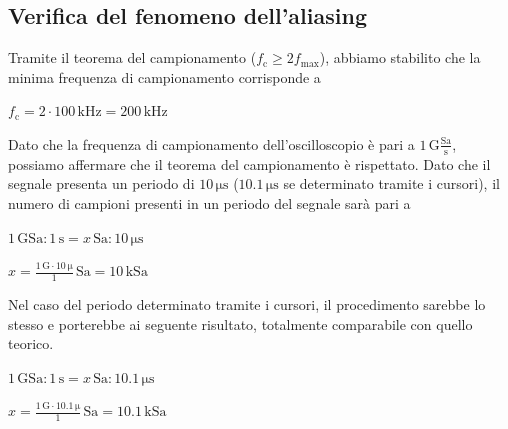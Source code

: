 \documentclass{article}
\begin{document}
		\subsection{Verifica del fenomeno dell’aliasing}
			Tramite il teorema del campionamento ($ f_{\mathrm{c}} \geq 2 f_{\mathrm{max}} $), abbiamo stabilito che la minima frequenza di campionamento corrisponde a
			\newline
			\begin{center}
				$ f_{\mathrm{c}} = 2 \cdot 100 \, \mathrm{kHz} = 200 \, \mathrm{kHz} $
			\end{center}
			\newline
			Dato che la frequenza di campionamento dell'oscilloscopio è pari a $ 1 \, \mathrm{G\frac{Sa}{s}} $, possiamo affermare che il teorema del campionamento è rispettato.
			\newline
			Dato che il segnale presenta un periodo di $ 10 \, \mathrm{\mu s} $ ($ 10.1 \, \mathrm{\mu s} $ se determinato tramite i cursori), il numero di campioni presenti in un periodo del segnale sarà pari a
			\newline
			\begin{center}
				$ 1 \, \mathrm{GSa} : 1 \, \mathrm{s} = x \, \mathrm{Sa} : 10 \, \mathrm{\mu s} $
			\end{center}
			\newline
			\begin{center}
				$ x = \mathrm{\frac{1 \, G \cdot 10 \, \mu}{1}} \, \mathrm{Sa} = 10 \, \mathrm{kSa} $
			\end{center}
			\newline
			Nel caso del periodo determinato tramite i cursori, il procedimento sarebbe lo stesso e porterebbe ai seguente risultato, totalmente comparabile con quello teorico.
			\newline
			\begin{center}
				$ 1 \, \mathrm{GSa} : 1 \, \mathrm{s} = x \, \mathrm{Sa} : 10.1 \, \mathrm{\mu s} $
			\end{center}
			\newline
			\begin{center}
				$ x = \mathrm{\frac{1 \, G \cdot 10.1 \, \mu}{1}} \, \mathrm{Sa} = 10.1 \, \mathrm{kSa} $
			\end{center}
\end{document}
